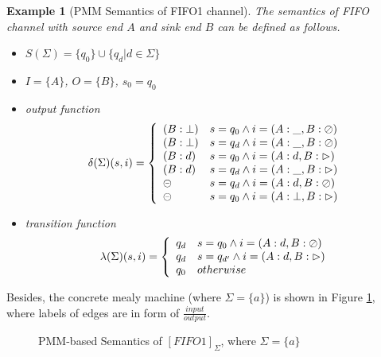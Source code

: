 \documentclass[conference, a4paper]{IEEEtran}
\newtheorem{example}{Example}
\newcommand{\rblock}[0]{\circleddash}
\newcommand{\rread}[0]{\rhd}
\newcommand{\rnoread}[0]{\oslash}
\newcommand{\smap}[1]{[{#1}]}
\begin{document}
\begin{example}[PMM Semantics of FIFO1 channel]
  \label{example:pmmfifo}
  The semantics of FIFO channel with source end $A$ and sink end $B$ can be defined as follows.
  \begin{itemize}
    \item[-] $S(\Sigma)=\{q_0\}\cup\{q_d|d\in\Sigma\}$
    \item[-] $I=\{A\}$, $O=\{B\}$, $s_0=q_0$
    \item[-] output function
      \begin{displaymath}
        \delta(\Sigma)(s,i)=\left\{
        \begin{array}[ht]{ll}
          (B:\bot) & s=q_0\land i=(A:\_,B:\rnoread) \\
          (B:\bot) & s=q_d\land i=(A:\_,B:\rnoread) \\     
          (B:d) & s=q_0\land i=(A:d,B:\rread)\\
          (B:d) & s=q_d\land i=(A:\_,B:\rread)\\
          \rblock & s=q_d\land i=(A:d,B:\rnoread) \\
          \rblock & s=q_0\land i=(A:\bot,B:\rread) \\
        \end{array}
        \right.
      \end{displaymath}
    \item[-] transition function
      \begin{displaymath}
        \lambda(\Sigma)(s,i)=\left\{
        \begin{array}[ht]{ll}
          q_d & s=q_0\land i=(A:d,B:\rnoread) \\
          q_d & s=q_{d'}\land i=(A:d,B:\rread) \\
          q_0 & otherwise \\
        \end{array}
        \right.
      \end{displaymath}
  \end{itemize}
\end{example}

Besides, the concrete mealy machine (where $\Sigma=\{a\}$) is shown in Figure \ref{fig:pmmfifo},
where labels of edges are in form of $\frac{input}{output}$.
\begin{figure}[ht]
  \begin{center}
    
  \end{center}
  \caption{PMM-based Semantics of $\smap{FIFO1}_\Sigma$, where $\Sigma=\{a\}$}
  \label{fig:pmmfifo}
\end{figure}
\end{document}
